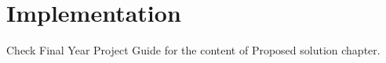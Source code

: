 
\chapter{Implementation}
Check Final Year Project Guide for the content of Proposed solution chapter.

\clearpage %
